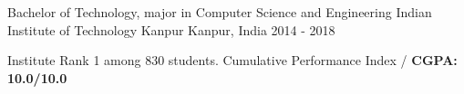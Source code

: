 


\begin{cventries}


\cventry
{Bachelor of Technology, major in Computer Science and Engineering} %
{Indian Institute of Technology Kanpur} %
{Kanpur, India} %
{2014 - 2018} %
{%
\begin{cvitems}
\item {Institute Rank 1 among 830 students. Cumulative Performance Index /
    \textbf{CGPA: 10.0/10.0}}
\end{cvitems}
}

\end{cventries}

